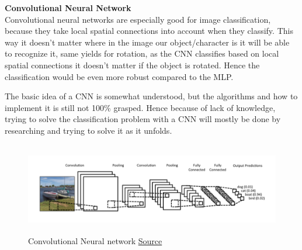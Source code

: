\documentclass[11pt,a4paper,UKenglish]{report}
\begin{document}
\begin{flushleft}
  \textbf{Convolutional Neural Network} \\
  Convolutional neural networks are especially good for image
  classification, because they take local spatial connections into account when
  they classify. This way it doesn't matter where in the image our
  object/character is it will be able to recognize it, same yields for rotation,
  as the CNN classifies based on local spatial connections it doesn't matter if
  the object is rotated. Hence the classification would be even more robust
  compared to the MLP. \par
  The basic idea of a CNN is somewhat understood, but the algorithms and how to
  implement it is still not 100\% grasped. Hence because of lack of knowledge,
  trying to solve the classification problem with a CNN will mostly be done
  by researching and trying to solve it as it unfolds.
\end{flushleft}

\begin{figure}[H]
  \centering
  \includegraphics[height=4cm]{res/CNN_architecture.png}
  \caption{Convolutional Neural network \href{ http://www.wildml.com/2015/11/understanding-convolutional-neural-networks-for-nlp/}{Source}}
  \label{fig:CNN_architecture}
\end{figure}
\end{document}
